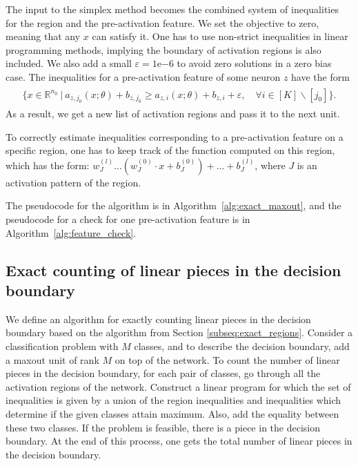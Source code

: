 \documentclass{article}
\theoremstyle{definition}
\newcommand{\nin}{n_0}
\begin{document}
The input to the simplex method becomes the combined system of inequalities for the region and the pre-activation feature. We set the objective to zero, meaning that any $x$ can satisfy it. 
One has to use non-strict inequalities in linear programming methods, implying the boundary of activation regions is also included.
We also add a small $\varepsilon = 1\mathrm{e}{-6}$ to avoid zero solutions in a zero bias case.
The inequalities for a pre-activation feature of some neuron $z$ have the form
\begin{align*}
    \begin{split}
        \{x \in \mathbb{R}^{\nin} \ | \  a_{z, j_0}(x; \theta) + b_{z, j_0} \geq a_{z, i}(x; \theta) + b_{z, i} + \varepsilon, \quad \forall i \in [K] \backslash [j_0] \}.
    \end{split}
\end{align*}
As a result, we get a new list of activation regions and pass it to the next unit.

To correctly estimate inequalities corresponding to a pre-activation feature on a specific region, one has to keep track of the function computed on this region, which has the form: $w_{{J}}^{(l)} \dots (w_{{J}}^{(0)} \cdot x + b_{{J}}^{(0)}) + \dots + b_{{J}}^{(l)}$, where $J$ is an activation pattern of the region.

The pseudocode for the algorithm is in Algorithm~\ref{alg:exact_maxout}, and the pseudocode for a check for one pre-activation feature is in Algorithm~\ref{alg:feature_check}.

\subsection{Exact counting of linear pieces in the decision boundary}

We define an algorithm for exactly counting linear pieces in the decision boundary based on the algorithm from Section \ref{subseq:exact_regions}.
Consider a classification problem with $M$ classes, and to describe the decision boundary, add a maxout unit of rank $M$ on top of the network.
To count the number of linear pieces in the decision boundary, for each pair of classes, go through all the activation regions of the network.
Construct a linear program for which the set of inequalities is given by a union of the region inequalities and inequalities which determine if the given classes attain maximum. Also, add the equality between these two classes. 
If the problem is feasible, there is a piece in the decision boundary.
At the end of this process, one gets the total number of linear pieces in the decision boundary. 
\end{document}
